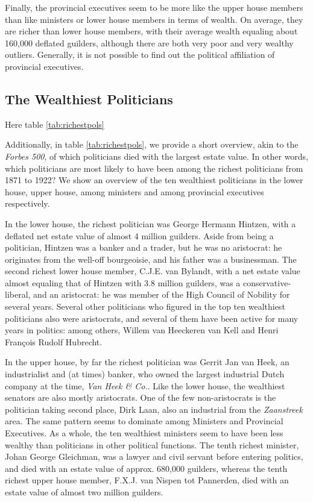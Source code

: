     Finally, the provincial executives seem to be more like the upper house members than like ministers or lower house members in terms of wealth. On average, they are richer than lower house members, with their average wealth equaling about 160,000 deflated guilders, although there are both very poor and very wealthy outliers. Generally, it is not possible to find out the political affiliation of provincial executives. 
    
    
\subsection{The Wealthiest Politicians}
    
    \begin{center}
    Here table \ref{tab:richestpols}
    \end{center}

    Additionally, in table \ref{tab:richestpols}, we provide a short overview, akin to the \textit{Forbes 500}, of which politicians died with the largest estate value. In other words, which politicians are most likely to have been among the richest politicians from 1871 to 1922? We show an overview of the ten wealthiest politicians in the lower house, upper house, among ministers and among provincial executives respectively. 
    
    In the lower house, the richest politician was George Hermann Hintzen, with a deflated net estate value of almost 4 million guilders. Aside from being a politician, Hintzen was a banker and a trader, but he was no aristocrat: he originates from the well-off bourgeoisie, and his father was a businessman. The second richest lower house member, C.J.E. van Bylandt, with a net estate value almost equaling that of Hintzen with 3.8 million guilders, was a conservative-liberal, and an aristocrat: he was member of the High Council of Nobility for several years. Several other politicians who figured in the top ten wealthiest politicians also were aristocrats, and several of them have been active for many years in politics: among others, Willem van Heeckeren van Kell and Henri François Rudolf Hubrecht.
    
    In the upper house, by far the richest politician was Gerrit Jan van Heek, an industrialist and (at times) banker, who owned the largest industrial Dutch company at the time, \textit{Van Heek \& Co.}. Like the lower house, the wealthiest senators are also mostly aristocrats. One of the few non-aristocrats is the politician taking second place, Dirk Laan, also an industrial from the \textit{Zaanstreek} area. The same pattern seems to dominate among Ministers and Provincial Executives. As a whole, the ten wealthiest ministers seem to have been less wealthy than politicians in other political functions. The tenth richest minister, Johan George Gleichman, was a lawyer and civil servant before entering politics, and died with an estate value of approx. 680,000 guilders, whereas the tenth richest upper house member, F.X.J. van Nispen tot Pannerden, died with an estate value of almost two million guilders. 
    
